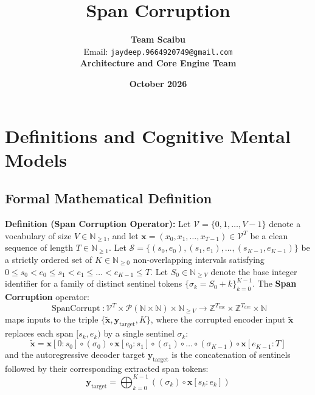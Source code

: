 \documentclass[11pt,a4paper]{article}
\title{\textbf{Span Corruption}}
\author{\textbf{Team Scaibu} \\ \small Email: \texttt{jaydeep.9664920749@gmail.com} \\ \small \textbf{Architecture and Core Engine Team}}
\date{\textbf{October 2026}}
\theoremstyle{definition}
\begin{document}
\maketitle

\section{Definitions and Cognitive Mental Models}

\subsection{Formal Mathematical Definition}
\textbf{Definition (Span Corruption Operator):}
Let $\mathcal{V} = \{0, 1, \dots, V-1\}$ denote a vocabulary of size $V \in \mathbb{N}_{\ge 1}$, and let $\mathbf{x} = (x_0, x_1, \dots, x_{T-1}) \in \mathcal{V}^T$ be a clean sequence of length $T \in \mathbb{N}_{\ge 1}$. Let $\mathcal{S} = \{(s_0, e_0), (s_1, e_1), \dots, (s_{K-1}, e_{K-1})\}$ be a strictly ordered set of $K \in \mathbb{N}_{\ge 0}$ non-overlapping intervals satisfying $0 \le s_0 < e_0 \le s_1 < e_1 \le \dots < e_{K-1} \le T$. Let $S_0 \in \mathbb{N}_{\ge V}$ denote the base integer identifier for a family of distinct sentinel tokens $\{\sigma_k = S_0 + k\}_{k=0}^{K-1}$.
The \textbf{Span Corruption} operator:
{\boldmath
\begin{equation}
\operatorname{SpanCorrupt}: \mathcal{V}^T \times \mathcal{P}(\mathbb{N} \times \mathbb{N}) \times \mathbb{N}_{\ge V} \longrightarrow \mathbb{Z}^{T_{\text{enc}}} \times \mathbb{Z}^{T_{\text{dec}}} \times \mathbb{N}
\end{equation}
}
maps inputs to the triple $\{\tilde{\mathbf{x}}, \mathbf{y}_{\text{target}}, K\}$, where the corrupted encoder input $\tilde{\mathbf{x}}$ replaces each span $[s_k, e_k)$ by a single sentinel $\sigma_k$:
{\boldmath
\begin{equation}
\tilde{\mathbf{x}} = \mathbf{x}[0:s_0] \circ (\sigma_0) \circ \mathbf{x}[e_0:s_1] \circ (\sigma_1) \circ \dots \circ (\sigma_{K-1}) \circ \mathbf{x}[e_{K-1}:T]
\end{equation}
}
and the autoregressive decoder target $\mathbf{y}_{\text{target}}$ is the concatenation of sentinels followed by their corresponding extracted span tokens:
{\boldmath
\begin{equation}
\mathbf{y}_{\text{target}} = \bigoplus_{k=0}^{K-1} \left( (\sigma_k) \circ \mathbf{x}[s_k:e_k] \right)
\end{equation}
}
\end{document}
